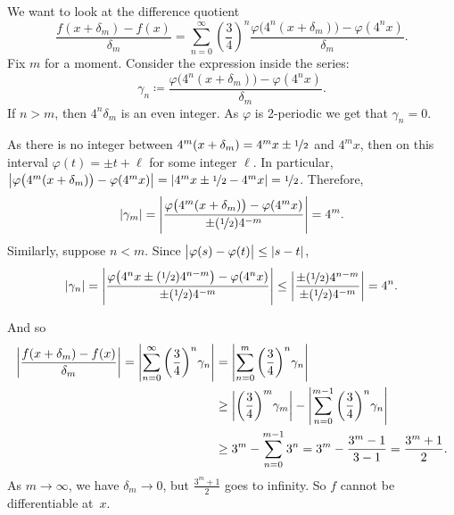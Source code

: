 \begin{example}
We want to look at the difference quotient
\begin{equation*}
\frac{f(x+\delta_m)-f(x)}{\delta_m}
=
\sum_{n=0}^\infty 
{\left(\frac{3}{4}\right)}^n
\frac{\varphi\bigl(4^n(x+\delta_m)\bigr)-\varphi(4^nx)}{\delta_m} .
\end{equation*}
Fix $m$ for a moment.  Consider the expression inside the series:
\begin{equation*}
\gamma_{n} \coloneqq
\frac{\varphi\bigl(4^n(x+\delta_m)\bigr)-\varphi(4^nx)}{\delta_m} .
\end{equation*}
If $n > m$, then $4^n\delta_m$ is an even integer.  As $\varphi$
is 2-periodic we get that $\gamma_n = 0$.

As there is no integer between 
$4^m(x+\delta_m) = 4^m x\pm\nicefrac{1}{2}$ and $4^m x$, then on this interval
$\varphi(t) = \pm t + \ell$ for some integer $\ell$.
In particular,
$\left\lvert {\varphi\bigl(4^m(x+ \delta_m)\bigr)-\varphi(4^mx)} \right\rvert =
\left\lvert {4^mx\pm\nicefrac{1}{2}-4^mx} \right\rvert = \nicefrac{1}{2}$.  Therefore,
\begin{equation*}
\lvert {\gamma_m} \rvert =
\left\lvert {
\frac{\varphi\bigl(4^m(x+\delta_m)\bigr)-\varphi(4^mx)}{\pm (\nicefrac{1}{2}) 4^{-m}}
} \right\rvert
= 4^m .
\end{equation*}
Similarly, suppose $n < m$.  Since $\bigl\lvert {\varphi(s) -\varphi(t)} \bigr\rvert \leq
\lvert {s-t} \rvert$,
\begin{equation*}
\lvert {\gamma_n} \rvert =
\left\lvert {\frac{\varphi\bigl(4^nx\pm(\nicefrac{1}{2})4^{n-m}\bigr)-\varphi(4^nx)}{\pm
(\nicefrac{1}{2}) 4^{-m}}} \right\rvert
\leq
\left\lvert {\frac{\pm(\nicefrac{1}{2})4^{n-m}}{\pm (\nicefrac{1}{2}) 4^{-m}}} \right\rvert = 4^n
.
\end{equation*}

And so
\begin{equation*}
\begin{split}
\left\lvert {
\frac{f(x+\delta_m)-f(x)}{\delta_m}
} \right\rvert
=
\left\lvert {
\sum_{n=0}^\infty 
{\left(\frac{3}{4}\right)}^n
\gamma_n
} \right\rvert
& =
\left\lvert {
\sum_{n=0}^m 
{\left(\frac{3}{4}\right)}^n
\gamma_n
} \right\rvert
\\
& \geq
\left\lvert {
{\left(\frac{3}{4}\right)}^m
\gamma_m} \right\rvert
-
\left\lvert {
\sum_{n=0}^{m-1} 
{\left(\frac{3}{4}\right)}^n
\gamma_n
} \right\rvert
\\
& \geq
3^m
-
\sum_{n=0}^{m-1} 
3^n
=
3^m
-
\frac{3^{m}-1}{3-1}
=
\frac{3^m +1}{2} .
\end{split}
\end{equation*}
As $m \to \infty$, we have
$\delta_m \to 0$, but $\frac{3^m+1}{2}$
goes to infinity.  So $f$ cannot be differentiable at~$x$.
\end{example}

